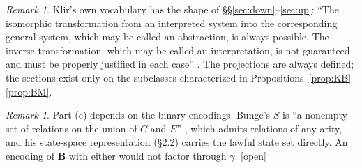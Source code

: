 \documentclass[11pt]{article}
\theoremstyle{definition}
\theoremstyle{remark}
\newtheorem{remark}[theorem]{Remark}
\newcommand{\B}{\mathbf{B}}
\begin{document}
\begin{remark}
Klir's own vocabulary has the shape of \S\S\ref{sec:down}--\ref{sec:up}: ``The isomorphic transformation from an interpreted system into the corresponding general system, which may be called an abstraction, is always possible. The inverse transformation, which may be called an interpretation, is not guaranteed and must be properly justified in each case'' \cite[\S2.4]{klir2001}. The projections are always defined; the sections exist only on the subclasses characterized in Propositions~\ref{prop:KB}--\ref{prop:BM}.
\end{remark}

\begin{remark}
Part (c) depends on the binary encodings. Bunge's $S$ is ``a nonempty set of relations on the union of $C$ and $E$'' \cite[\S1.1]{bunge1979}, which admits relations of any arity, and his state-space representation (\S2.2) carries the lawful state set directly. An encoding of $\B$ with either would not factor through $\gamma$. \textsf{[open]}
\end{remark}

\end{document}
